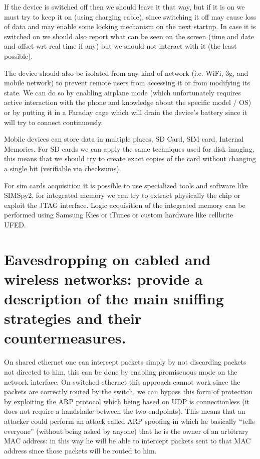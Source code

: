 \documentclass[a4paper, 12pt]{article}
\begin{document}
If the device is switched off then we should leave it that way, but if it is on we must try to keep it on (using charging cable), since switching it off may cause loss of data and may enable some locking mechanism on the next startup. In case it is switched on we should also report what can be seen on the screen (time and date and offset wrt real time if any) but we should not interact with it (the least possible).

The device should also be isolated from any kind of network (i.e. WiFi, 3g, and mobile network) to prevent remote users from accessing it or from modifying its state. We can do so by enabling airplane mode (which unfortunately requires active interaction with the phone and knowledge about the specific model / OS) or by putting it in a Faraday cage which will drain the device's battery since it will try to connect continuously.

Mobile devices can store data in multiple places, SD Card, SIM card, Internal Memories. For SD cards we can apply the same techniques used for disk imaging, this means that we should try to create exact copies of the card without changing a single bit (verifiable via checksums).

For sim cards acquisition it is possible to use specialized tools and software like SIMSpy2, for integrated memory we can try to extract physically the chip or exploit the JTAG interface. Logic acquisition of the integrated memory can be performed using Samsung Kies or iTunes or custom hardware like cellbrite UFED.

\section{Eavesdropping on cabled and wireless networks: provide a description of
the main sniffing strategies and their countermeasures.}

On shared ethernet one can intercept packets simply by not discarding packets not directed to him, this can be done by enabling promiscuous mode on the network interface. On switched ethernet this approach cannot work since the packets are correctly routed by the switch, we can bypass this form of protection by exploiting the ARP protocol which being based on UDP is connectionless (it does not require a handshake between the two endpoints). This means that an attacker could perform an attack called ARP spoofing in which he basically ``tells everyone'' (without being asked by anyone) that he is the owner of an arbitrary MAC address: in this way he will be able to intercept packets sent to that MAC address since those packets will be routed to him.
\end{document}
